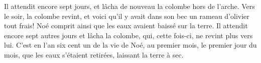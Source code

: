 Il attendit encore sept jours,
	et lâcha de nouveau la colombe hors de l’arche.
Vers le soir, la colombe revint,
	et voici qu’il y avait dans son bec un rameau d’olivier tout frais!
	Noé comprit ainsi que les eaux avaient baissé sur la terre.
Il attendit encore sept autres jours et lâcha la colombe,
	qui, cette fois-ci, ne revint plus vers lui.
C’est en l’an six cent un de la vie de Noé,
	au premier mois, le premier jour du mois,
	que les eaux s’étaient retirées, laissant la terre à sec.
